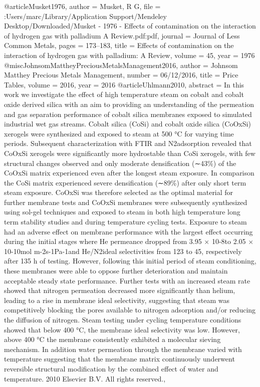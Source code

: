 @article{Musket1976,
author = {Musket, R G},
file = {:Users/marc/Library/Application Support/Mendeley Desktop/Downloaded/Musket - 1976 - Effects of contamination on the interaction of hydrogen gas with palladium A Review.pdf:pdf},
journal = {Journal of Less Common Metals},
pages = {173--183},
title = {{Effects of contamination on the interaction of hydrogen gas with palladium: A Review}},
volume = {45},
year = {1976}
}
@misc{JohnsomMattheyPreciousMetalsManagement2016,
author = {{Johnsom Matthey Precious Metals Management}},
number = {06/12/2016},
title = {{Price Tables}},
volume = {2016},
year = {2016}
}
@article{Uhlmann2010,
abstract = {In this work we investigate the effect of high temperature steam on cobalt and cobalt oxide derived silica with an aim to providing an understanding of the permeation and gas separation performance of cobalt silica membranes exposed to simulated industrial wet gas streams. Cobalt silica (CoSi) and cobalt oxide silica (CoOxSi) xerogels were synthesized and exposed to steam at 500 °C for varying time periods. Subsequent characterization with FTIR and N2adsorption revealed that CoOxSi xerogels were significantly more hydrostable than CoSi xerogels, with few structural changes observed and only moderate densification (∼43{\%}) of the CoOxSi matrix experienced even after the longest steam exposure. In comparison the CoSi matrix experienced severe densification (∼89{\%}) after only short term steam exposure. CoOxSi was therefore selected as the optimal material for further membrane tests and CoOxSi membranes were subsequently synthesized using sol-gel techniques and exposed to steam in both high temperature long term stability studies and during temperature cycling tests. Exposure to steam had an adverse effect on membrane performance with the largest effect occurring during the initial stages where He permeance dropped from 3.95 × 10-8to 2.05 × 10-10mol m-2s-1Pa-1and He/N2ideal selectivities from 123 to 45, respectively after 135 h of testing. However, following this initial period of steam conditioning, these membranes were able to oppose further deterioration and maintain acceptable steady state performance. Further tests with an increased steam rate showed that nitrogen permeation decreased more significantly than helium, leading to a rise in membrane ideal selectivity, suggesting that steam was competitively blocking the pores available to nitrogen adsorption and/or reducing the diffusion of nitrogen. Steam testing under cycling temperature conditions showed that below 400 °C, the membrane ideal selectivity was low. However, above 400 °C the membrane consistently exhibited a molecular sieving mechanism. In addition water permeation through the membrane varied with temperature suggesting that the membrane matrix continuously underwent reversible structural modification by the combined effect of water and temperature. {\textcopyright} 2010 Elsevier B.V. All rights reserved.},
}

